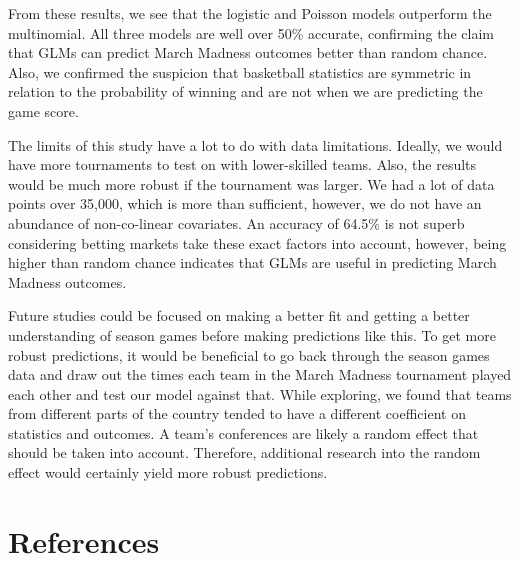 \documentclass[
  english,
  man,floatsintext]{apa6}
\begin{document}
From these results, we see that the logistic and Poisson models outperform the multinomial. All three models are well over 50\% accurate, confirming the claim that GLMs can predict March Madness outcomes better than random chance. Also, we confirmed the suspicion that basketball statistics are symmetric in relation to the probability of winning and are not when we are predicting the game score.

The limits of this study have a lot to do with data limitations. Ideally, we would have more tournaments to test on with lower-skilled teams. Also, the results would be much more robust if the tournament was larger. We had a lot of data points over 35,000, which is more than sufficient, however, we do not have an abundance of non-co-linear covariates. An accuracy of 64.5\% is not superb considering betting markets take these exact factors into account, however, being higher than random chance indicates that GLMs are useful in predicting March Madness outcomes.

Future studies could be focused on making a better fit and getting a better understanding of season games before making predictions like this. To get more robust predictions, it would be beneficial to go back through the season games data and draw out the times each team in the March Madness tournament played each other and test our model against that. While exploring, we found that teams from different parts of the country tended to have a different coefficient on statistics and outcomes. A team's conferences are likely a random effect that should be taken into account. Therefore, additional research into the random effect would certainly yield more robust predictions.

\newpage

\hypertarget{references}{%
\section{References}\label{references}}

\begingroup
\setlength{\parindent}{-0.5in}
\setlength{\leftskip}{0.0in}
\end{document}
